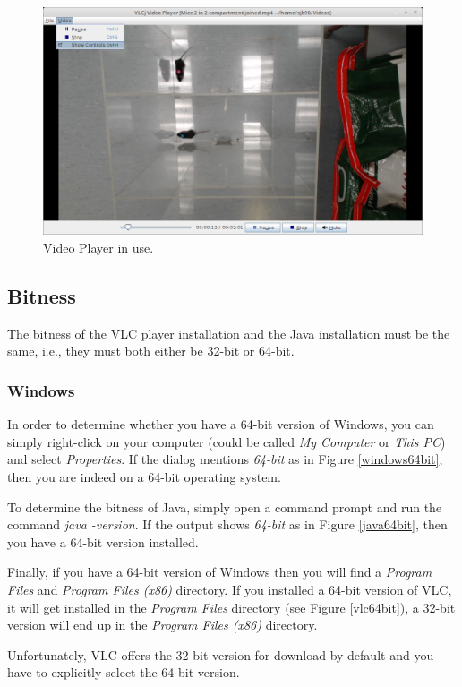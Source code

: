\documentclass[a4paper]{book}
\begin{document}
\begin{figure}[htb]
  \centering
  \includegraphics[width=12.0cm]{images/video_player_in_use.png}
  \caption{Video Player in use.}
  \label{VideoPlayerInUse}
\end{figure}

\subsection{Bitness}
\label{bitness}
The bitness of the VLC player installation and the Java installation must be
the same, i.e., they must both either be 32-bit or 64-bit.

\subsubsection{Windows}
In order to determine whether you have a 64-bit version of Windows, you can simply
right-click on your computer (could be called \textit{My Computer} or
\textit {This PC}) and select \textit{Properties}. If the dialog mentions
\textit{64-bit} as in Figure \ref{windows64bit}, then you are indeed on
a 64-bit operating system.

To determine the bitness of Java, simply open a command prompt and run
the command \textit{java -version}. If the output shows \textit{64-bit} as
in Figure \ref{java64bit}, then you have a 64-bit version installed.

Finally, if you have a 64-bit version of Windows then you will find a
\textit{Program Files} and \textit{Program Files (x86)} directory.
If you installed a 64-bit version of VLC, it will get installed in the
\textit{Program Files} directory (see Figure \ref{vlc64bit}), a 32-bit
version will end up in the \textit{Program Files (x86)} directory.

Unfortunately, VLC offers the 32-bit version for download by default and
you have to explicitly select the 64-bit version.
\end{document}
